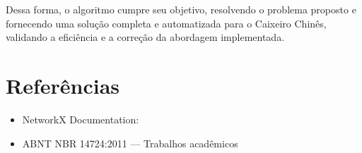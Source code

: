 \documentclass[12pt]{article}
\begin{document}
Dessa forma, o algoritmo cumpre seu objetivo, resolvendo o problema proposto e fornecendo uma solução completa e automatizada para o Caixeiro Chinês, validando a eficiência e a correção da abordagem implementada.

\section{Referências}
\begin{itemize}
    \item NetworkX Documentation: 
    \item ABNT NBR 14724:2011 — Trabalhos acadêmicos
\end{itemize}
\end{document}
